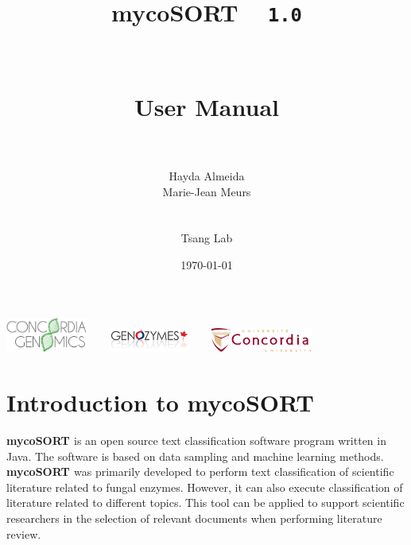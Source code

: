 \documentclass[11pt]{article}
\newcommand{\mycos}{{\bf{mycoSORT{ }}}}
\def\version{{\tt 1.0}}
\begin{document}
\title{\mycos{} ~ \version \\~\\~\\User Manual\\~\\}

\author{Hayda Almeida\\Marie-Jean Meurs\\~\\~\\Tsang Lab}

\date{\mydate\today}

\maketitle

\begin{center}
	\includegraphics[width=0.2\textwidth]{genomicslogogreen}$\qquad$\includegraphics[width=0.2\textwidth]{genozymeslogo}$\qquad$\includegraphics[width=0.25\textwidth]{concordialogo}\\
\end{center}

\pagestyle{empty}

\pagebreak
\tableofcontents

\pagebreak

\section{Introduction to mycoSORT}

\mycos{} is an open source text classification software program written in Java.
The software is based on data sampling and machine learning methods.
\mycos{} was primarily developed to perform text classification of scientific literature related to fungal enzymes.
However, it can also execute classification of literature related to different topics. 
This tool can be applied to support scientific researchers in the selection of relevant documents when performing literature review.
\end{document}
